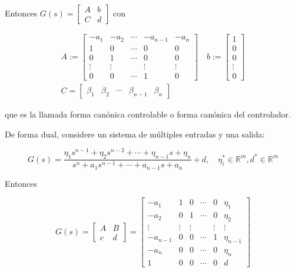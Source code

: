 Entonces $G(s)=\left[\begin{array}{l|l}A & b \\ \hline C & d\end{array}\right]$ con

$$
\begin{gathered}
A:=\left[\begin{array}{ccccc}
-a_{1} & -a_{2} & \cdots & -a_{n-1} & -a_{n} \\
1 & 0 & \cdots & 0 & 0 \\
0 & 1 & \cdots & 0 & 0 \\
\vdots & \vdots & & \vdots & \vdots \\
0 & 0 & \cdots & 1 & 0
\end{array}\right] \quad b:=\left[\begin{array}{c}
1 \\
0 \\
0 \\
\vdots \\
0
\end{array}\right] \\
C=\left[\begin{array}{lllll}
\beta_{1} & \beta_{2} & \cdots & \beta_{n-1} & \beta_{n}
\end{array}\right]
\end{gathered}
$$

que es la llamada forma canónica controlable o forma canónica del controlador.

De forma dual, considere un sistema de múltiples entradas y una salida:

$$
G(s)=\frac{\eta_{1} s^{n-1}+\eta_{2} s^{n-2}+\cdots+\eta_{n-1} s+\eta_{n}}{s^{n}+a_{1} s^{n-1}+\cdots+a_{n-1} s+a_{n}}+d, \quad \eta_{i}^{*} \in \mathbb{R}^{m}, d^{*} \in \mathbb{R}^{m}
$$

Entonces

$$
G(s)=\left[\begin{array}{c|c}
A & B \\
\hline c & d
\end{array}\right]=\left[\begin{array}{ccccc|c}
-a_{1} & 1 & 0 & \cdots & 0 & \eta_{1} \\
-a_{2} & 0 & 1 & \cdots & 0 & \eta_{2} \\
\vdots & \vdots & \vdots & & \vdots & \vdots \\
-a_{n-1} & 0 & 0 & \cdots & 1 & \eta_{n-1} \\
-a_{n} & 0 & 0 & \cdots & 0 & \eta_{n} \\
\hline 1 & 0 & 0 & \cdots & 0 & d
\end{array}\right]
$$

